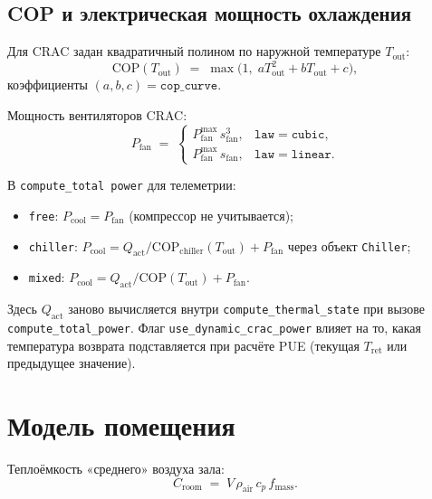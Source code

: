 \documentclass[12pt,a4paper]{article}
\begin{document}
\subsection{COP и электрическая мощность охлаждения}
Для CRAC задан квадратичный полином по наружной температуре $T_{\mathrm{out}}$:
\begin{equation}
  \mathrm{COP}(T_{\mathrm{out}}) \;=\; \max\bigl(1,\; a T_{\mathrm{out}}^2 + b T_{\mathrm{out}} + c\bigr),
\end{equation}
коэффициенты $(a,b,c) = \texttt{cop\_curve}$.

Мощность вентиляторов CRAC:
\begin{equation}
  P_{\mathrm{fan}} \;=\;
  \begin{cases}
    P_{\mathrm{fan}}^{\max}\, s_{\mathrm{fan}}^3, & \texttt{law}=\texttt{cubic},\\[4pt]
    P_{\mathrm{fan}}^{\max}\, s_{\mathrm{fan}}, & \texttt{law}=\texttt{linear}.
  \end{cases}
\end{equation}

В \texttt{compute\_total power} для телеметрии:
\begin{itemize}[leftmargin=*]
  \item \texttt{free}: $P_{\mathrm{cool}} = P_{\mathrm{fan}}$ (компрессор не учитывается);
  \item \texttt{chiller}: $P_{\mathrm{cool}} = Q_{\mathrm{act}}/\mathrm{COP}_{\mathrm{chiller}}(T_{\mathrm{out}}) + P_{\mathrm{fan}}$
    через объект \texttt{Chiller};
  \item \texttt{mixed}: $P_{\mathrm{cool}} = Q_{\mathrm{act}}/\mathrm{COP}(T_{\mathrm{out}}) + P_{\mathrm{fan}}$.
\end{itemize}

Здесь $Q_{\mathrm{act}}$ заново вычисляется внутри \texttt{compute\_thermal\_state} при вызове
\texttt{compute\_total\_power}. Флаг \texttt{use\_dynamic\_crac\_power} влияет на то, какая температура возврата
подставляется при расчёте PUE (текущая $T_{\mathrm{ret}}$ или предыдущее значение).

\section{Модель помещения}
Теплоёмкость «среднего» воздуха зала:
\begin{equation}
  C_{\mathrm{room}} \;=\; V\, \rho_{\mathrm{air}}\, c_p\, f_{\mathrm{mass}}.
\end{equation}
\end{document}
